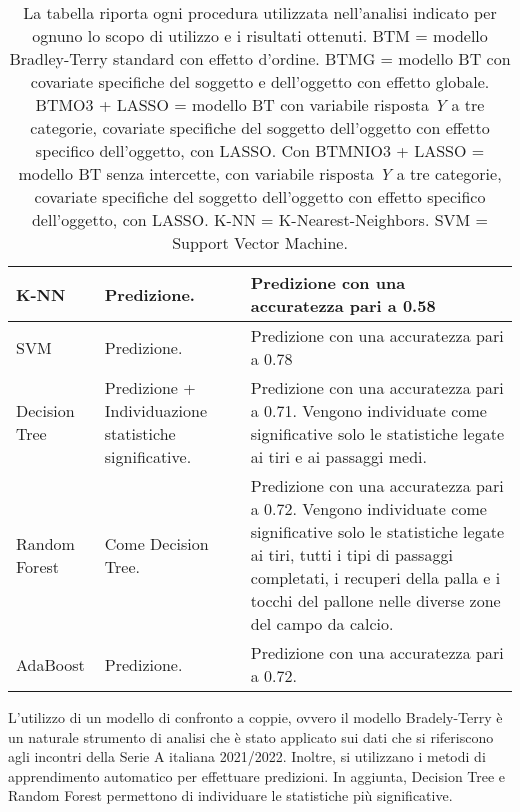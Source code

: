 \begin{table}[]
\begin{longtable}{|C{0.18\textwidth}|C{0.3\textwidth}|C{0.5\textwidth}|}
	K-NN & Predizione. & Predizione con una accuratezza pari a 0.58\\
	\hline	
	SVM & Predizione. & Predizione con una accuratezza pari a 0.78\\
	\hline	
	Decision Tree & Predizione + Individuazione statistiche significative. & Predizione con una accuratezza pari a 0.71. Vengono individuate come significative solo le statistiche legate ai tiri e ai passaggi medi.\\
	\hline	
	Random Forest & Come Decision Tree. & Predizione con una accuratezza pari a 0.72. Vengono individuate come significative solo le statistiche legate ai tiri, tutti i tipi di passaggi completati, i recuperi della palla e i tocchi del pallone nelle diverse zone del campo da calcio. \\
	\hline	
	AdaBoost & Predizione. & Predizione con una accuratezza pari a 0.72. \\
	\hline
\end{longtable}	
\vspace*{5mm}

\caption{La tabella riporta ogni procedura utilizzata nell'analisi indicato per ognuno lo scopo di utilizzo e i risultati ottenuti. BTM = modello Bradley-Terry standard con effetto d'ordine. BTMG = modello BT con covariate specifiche del soggetto e dell'oggetto con effetto globale. BTMO3 + LASSO = modello BT con variabile risposta \emph{Y} a tre categorie, covariate specifiche del soggetto dell'oggetto con effetto specifico dell'oggetto, con LASSO. Con BTMNIO3 + LASSO = modello BT senza intercette, con variabile risposta \emph{Y} a tre categorie, covariate specifiche del soggetto dell'oggetto con effetto specifico dell'oggetto, con LASSO. K-NN = K-Nearest-Neighbors. SVM = Support Vector Machine.} \label{tab:fine}

\end{table}
L'utilizzo di un modello di confronto a coppie, ovvero il modello Bradely-Terry è un naturale strumento di analisi che è stato applicato sui dati che si riferiscono agli incontri della Serie A italiana 2021/2022. 
Inoltre, si utilizzano i metodi di apprendimento automatico per effettuare predizioni. In aggiunta, Decision Tree e Random Forest permettono di individuare le statistiche più significative. \\
